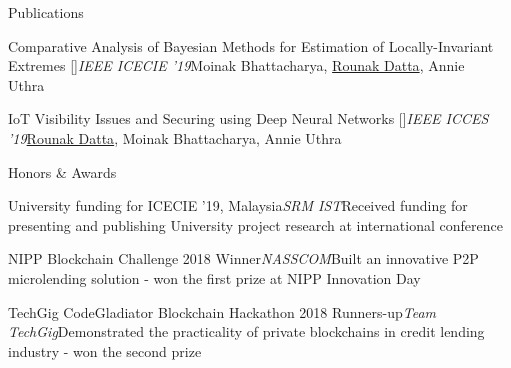 \documentclass{resume}
\begin{document}
    \begin{rSection}{Publications}
      \begin{rEmptySubsection}{Comparative Analysis of Bayesian Methods for Estimation of Locally-Invariant\\Extremes [\href{https://www.researchgate.net/publication/335985085_Comparative_Analysis_of_Bayesian_Methods_for_Estimation_of_Locally-Invariant_Extremes}{}]}{\textit{IEEE ICECIE '19}}{Moinak Bhattacharya, \underline{Rounak Datta}, Annie Uthra}{~}
      \end{rEmptySubsection}

      \begin{rEmptySubsection}{IoT Visibility Issues and Securing using Deep Neural Networks [\href{https://www.researchgate.net/publication/336057690_IoT_Visibility_Issues_and_Securing_using_Deep_Neural_Networks}{}]}{\textit{IEEE ICCES '19}}{\underline{Rounak Datta}, Moinak Bhattacharya, Annie Uthra}{~}
      \end{rEmptySubsection}

    \end{rSection}

    \begin{rSection}{Honors \& Awards}
      \begin{rEmptySubsection}{University funding for ICECIE '19, Malaysia}{\textit{SRM IST}}{Received funding for presenting and publishing University project research at international conference}{~}
      \end{rEmptySubsection}

      \begin{rEmptySubsection}{NIPP Blockchain Challenge 2018 Winner}{\textit{NASSCOM}}{Built an innovative P2P microlending solution - won the first prize at NIPP Innovation Day}{~}
      \end{rEmptySubsection}

      \begin{rEmptySubsection}{TechGig CodeGladiator Blockchain Hackathon 2018 Runners-up}{\textit{Team TechGig}}{Demonstrated the practicality of private blockchains in credit lending industry - won the second prize}{~}
      \end{rEmptySubsection}

    \end{rSection}
\end{document}
